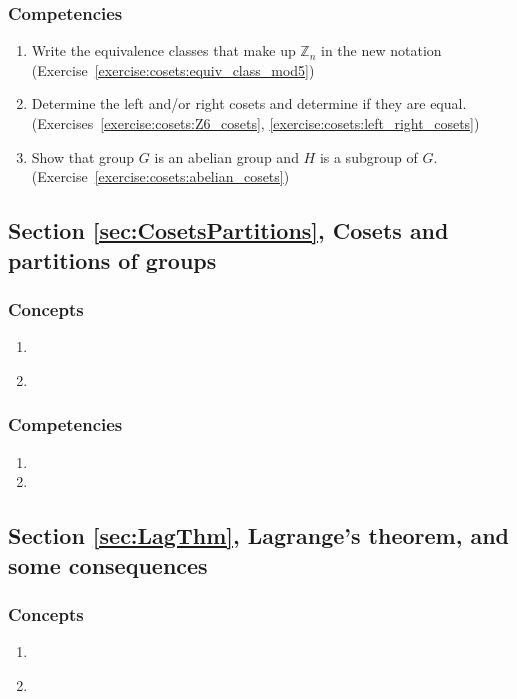 \subsubsection*{Competencies}
\begin{enumerate}
\item
Write the equivalence classes that make up ${\mathbb Z}_n$ in the new notation (Exercise~\ref{exercise:cosets:equiv_class_mod5})
\item
Determine the left and/or right cosets and determine if they are equal. (Exercises~\ref{exercise:cosets:Z6_cosets}, \ref{exercise:cosets:left_right_cosets})
\item
Show that group $G$ is an abelian group and $H$ is a subgroup of $G$. (Exercise~\ref{exercise:cosets:abelian_cosets})
\end{enumerate}


\subsection*{Section \ref{sec:CosetsPartitions}, Cosets and partitions of groups}
\subsubsection*{Concepts}
\begin{enumerate}
\item 
\
\
\
\item
\end{enumerate}

\subsubsection*{Competencies}
\begin{enumerate}
\item
\item
\end{enumerate}


\subsection*{Section \ref{sec:LagThm}, Lagrange's theorem, and some consequences}
\subsubsection*{Concepts}
\begin{enumerate}
\item 
\
\
\
\item
\end{enumerate}

